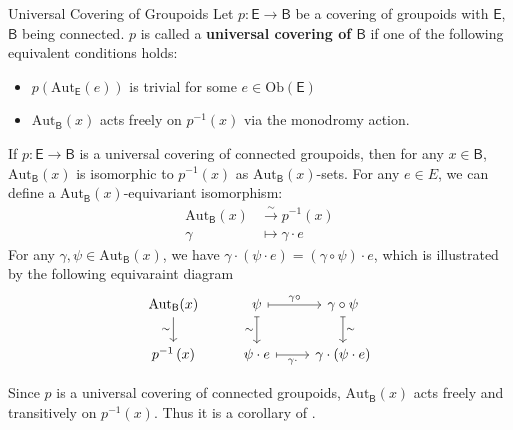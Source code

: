 \documentclass{report}
\begin{document}
\begin{definition}{Universal Covering of Groupoids}{}
	Let $p:\mathsf{E}\to \mathsf{B}$ be a covering of groupoids with $\mathsf{E}$, $\mathsf{B}$ being connected. $p$ is called a \textbf{universal covering of $\mathsf{B}$} if one of the following equivalent conditions holds:
	\begin{itemize}
		\item $p(\mathrm{Aut}_{\mathsf{E}}(e))$ is trivial for some $e\in \mathrm{Ob}(\mathsf{E})$
		\item $\mathrm{Aut}_{\mathsf{B}}(x)$ acts freely on $p^{-1}(x)$ via the monodromy action.
	\end{itemize}
\end{definition}

\begin{proposition}{}{}
	If $p:\mathsf{E}\to \mathsf{B}$ is a universal covering of connected groupoids, then for any $x\in \mathsf{B}$, $\mathrm{Aut}_{\mathsf{B}}(x)$ is isomorphic to $ p^{-1}(x)$ as $\mathrm{Aut}_{\mathsf{B}}(x)$-sets. For any $e\in E$, we can define a $\mathrm{Aut}_{\mathsf{B}}(x)$-equivariant isomorphism: 
	\begin{align*}
		\mathrm{Aut}_{\mathsf{B}}(x) &\stackrel{\sim}{\longrightarrow} p^{-1}(x)
		\\
		\gamma &\longmapsto \gamma\cdot e
	\end{align*}
	For any $\gamma,\psi\in \mathrm{Aut}_{\mathsf{B}}(x)$, we have $\gamma\cdot(\psi\cdot e)=(\gamma\circ \psi)\cdot e$, which is illustrated by the following equivaraint diagram 
	\begin{equation*}
		\begin{tikzcd}[ampersand replacement=\&]
			\mathrm{Aut}_{\mathsf{B}}(x) \arrow[d, "{\sim}"'] \& \psi \arrow[d, mapsto , "{\sim}"'] \arrow[r, mapsto, "\gamma\circ "] \& \gamma\circ \psi  \arrow[d, mapsto, "{\sim}"] \\
			p^{-1}\left(x\right)\& \psi \cdot e \arrow[r, mapsto, "{\gamma\cdot }"'] \&\gamma\cdot(\psi\cdot e)
		\end{tikzcd}
	\end{equation*}
\end{proposition}

\begin{prf}
	Since $p$ is a universal covering of connected groupoids, $\mathrm{Aut}_{\mathsf{B}}(x)$ acts freely and transitively on $p^{-1}(x)$. Thus it is a corollary of .
\end{prf}
\end{document}
